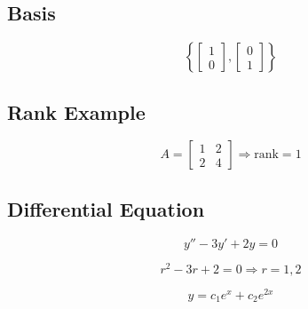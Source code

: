 \documentclass[10pt]{article}
\begin{document}
\subsection*{Basis}
\[
\left\{
\begin{bmatrix}1 \\ 0\end{bmatrix},
\begin{bmatrix}0 \\ 1\end{bmatrix}
\right\}
\]

\subsection*{Rank Example}
\[
A =
\begin{bmatrix}
1 & 2 \\
2 & 4
\end{bmatrix}
\Rightarrow \text{rank} = 1
\]

\subsection*{Differential Equation}
\[
y'' - 3y' + 2y = 0
\]

\[
r^2 - 3r + 2 = 0 \Rightarrow r=1,2
\]

\[
y = c_1 e^x + c_2 e^{2x}
\]
\end{document}

